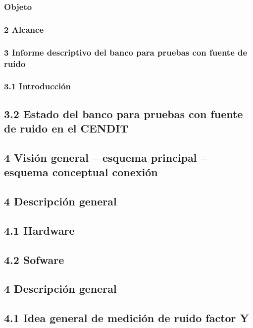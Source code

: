 \documentclass[paper=letter,oneside,fontsize=10pt,parskip=full]{article}
\title{}
\author{}
\date{2017-04-30}
\begin{document}
\clearpage\subsubsection[\-1 Objeto]{ Objeto}
\subsubsection{2 Alcance}
\subsubsection[3 Informe descriptivo del banco para pruebas con fuente de ruido]{3 Informe descriptivo del banco para
pruebas con fuente de ruido}
\subsubsection[3.1 Introducción]{3.1 Introducción}
\subsection{3.2 Estado del banco para pruebas con fuente de ruido en el CENDIT}
\subsection{}
\subsection{4 Visión general – esquema principal – esquema conceptual conexión}
\subsection{4 Descripción general}
\subsection{4.1 Hardware}
\subsection{4.2 Sofware}
\subsection{}
\subsection{4 Descripción general}
\subsection{4.1 Idea general de medición de ruido factor Y}
\end{document}
